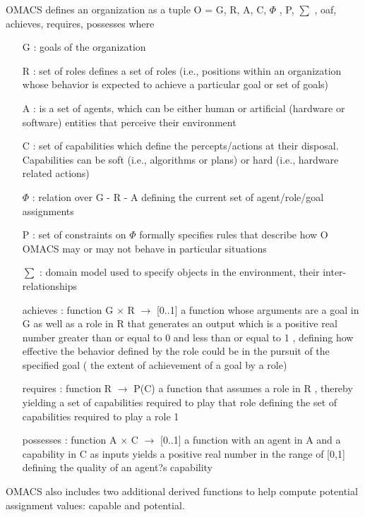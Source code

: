 OMACS defines an organization as a tuple O = \textlangle{} G, R, A, C, $\varPhi$ , P, $\sum$ ,
oaf, achieves, requires, possesses \textrangle{}
where
\begin{itemize}

\item[ G ]  
: goals of the organization 
\item[ R ]  
: set of roles  defines a set of roles (i.e., positions within an organization whose behavior
 is expected to achieve a particular goal or set of goals)
\item[ A ]  
: is a set of agents, which can be either human or artificial (hardware or software)
 entities that perceive their environment
\item[ C ]  
: set of capabilities  which define the percepts/actions at their disposal. Capabilities can be soft 
(i.e., algorithms or plans) or hard (i.e., hardware related actions)
\item[  $\varPhi$ ]  
:  relation over G - R - A defining the current set of agent/role/goal assignments
\item[ P ] 
:  set of constraints on  $\varPhi$  formally specifies rules that describe how O OMACS may or may not 
 behave in particular situations
\item[ $\sum$ ]  
: domain model used to specify objects in the environment, their inter-
relationships
\item[ achieves ]   
: function G $\times$ R $\rightarrow$ {[}0..1{]} a function whose arguments are a goal in G   as well
 as a role in R   that generates an output which is a positive real number greater  than or equal to 0 
 and less than or equal to 1 , defining how effective the behavior
 defined by the role could be in the pursuit of the specified goal   (  the extent of achievement of a goal by a role)
\item[requires] 
: function R $\rightarrow$ P(C)    a function that assumes a role in R  , thereby yielding a set 
of capabilities required to play that role  defining the set of capabilities required to play a role 1
\item[possesses] 
:   function A $\times$ C $\rightarrow$ {[}0..1{]} a function with an agent in A   and a capability in C 
  as inputs yields a positive real number in the range of [0,1] defining the quality of an agent?s capability



\end{itemize}
OMACS also includes two additional derived functions to help compute potential assignment values: 
capable and potential.
\cite{omacs0}

